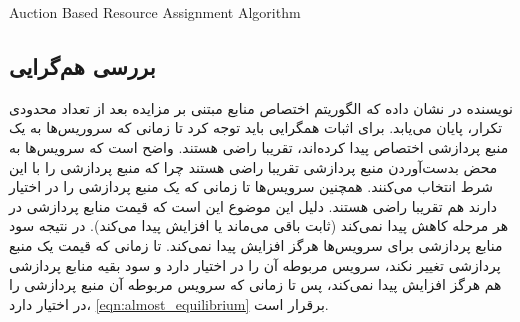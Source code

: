      \begin{latin}
        \begin{algorithm}[tp]
          \caption{Auction ‌Based Resource Assignment Algorithm}
          \label{alg:one_to_one:auction}
          \begin{algorithmic}[1]
             \label{state:auction_iteration:price_initialization}
              \EndFor
                 \label{state:service_iteration:check_assignment}
                   \label{state:service_iteration:find_max}
                   \label{state:service_iteration:compute_new_bid}
                   \label{state:service_iteration:send_bid}
                \EndIf
              \EndFor
                \EndIf
              \EndFor
            \EndWhile
          \end{algorithmic}
        \end{algorithm}
      \end{latin}

    \subsection{بررسی هم‌گرایی}
      نویسنده در \cite{auction_algorithms_bertsekas} نشان داده که الگوریتم اختصاص منابع مبتنی بر مزایده بعد از تعداد محدودی تکرار، پایان می‌یابد.
      برای اثبات همگرایی باید توجه کرد تا زمانی که سروریس‌ها به یک منبع پردازشی اختصاص پیدا کرده‌اند، تقریبا راضی هستند.
      واضح است که سرویس‌ها به محض بدست‌آوردن منبع پردازشی تقریبا راضی هستند چرا که منبع پردازشی را با این شرط انتخاب می‌کنند.
      همچنین سرویس‌ها تا زمانی که یک منبع پردازشی را در اختیار دارند هم تقریبا راضی هستند.
      دلیل این موضوع این است که قیمت منابع پردازشی در هر مرحله کاهش پیدا نمی‌کند (ثابت باقی می‌ماند یا افزایش پیدا می‌کند).
      در نتیجه سود منابع پردازشی برای سرویس‌ها هرگز افزایش پیدا نمی‌کند.
      تا زمانی که قیمت یک منبع پردازشی تغییر نکند، سرویس مربوطه آن را در اختیار دارد و سود بقیه منابع پردازشی هم هرگز افزایش پیدا نمی‌کند،‌ پس تا زمانی که سرویس مربوطه آن منبع پردازشی را در اختیار دارد، \cref{eqn:almost_equilibrium} برقرار است.

